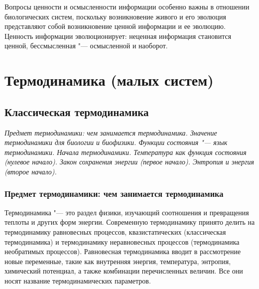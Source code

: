 \documentclass[12pt,a4paper,oneside]{book}
\begin{document}
Вопросы ценности и осмысленности информации особенно важны в отношении биологических систем, поскольку возникновение живого и его эволюция представляют собой возникновение ценной информации и ее эволюцию. Ценность информации эволюционирует: неценная информация становится ценной, бессмысленная "--- осмысленной и наоборот.



\chapter{Термодинамика (малых систем)}


\section{Классическая термодинамика}
{\it Предмет термодинамики: чем занимается термодинамика. Значение термодинамики для биологии и биофизики. Функции состояния "--- язык термодинамики. Начала термодинамики. Температура как функция состояния (нулевое начало). Закон сохранения энергии (первое начало). Энтропия и энергия (второе начало).}

\subsection{Предмет термодинамики: чем занимается термодинамика}

Термодинамика "--- это раздел физики, изучающий соотношения и превращения теплоты и других форм энергии. Современную термодинамику принято делить на термодинамику равновесных процессов, квазистатических (классическая термодинамика) и термодинамику неравновесных процессов (термодинамика необратимых процессов). Равновесная термодинамика вводит в рассмотрение новые переменные, такие как внутренняя энергия, температура, энтропия, химический потенциал, а также комбинации перечисленных величин. Все они носят название термодинамических параметров.
\end{document}
